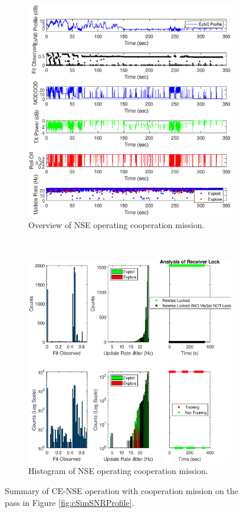 \begin{figure}[ht]
\centering
\begin{subfigure}{\linewidth}
	\centering
	\includegraphics[scale=0.5]{figures/c_sim_results/sim22_NSE_overview_coop.eps}
	\caption{Overview of NSE operating cooperation mission.}
	\label{fig:cSimNSEOverview}
\end{subfigure}\\
\begin{subfigure}{\linewidth}
	\centering
	\includegraphics[scale=0.5]{figures/c_sim_results/sim22_NSE_hists_coop.eps}
	\caption{Histogram of NSE operating cooperation mission.}
	\label{fig:cSimNSEHists}
\end{subfigure}
\caption{Summary of CE-NSE operation with cooperation mission on the pass in Figure \ref{fig:cSimSNRProfile}.}
\label{fig:c22NSECoop}
\end{figure}
